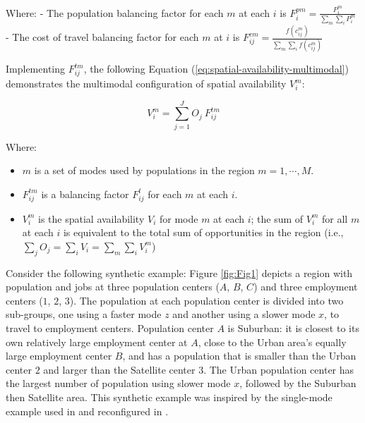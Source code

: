 \documentclass[]{trbunofficial}
\providecommand{\tightlist}{%
  \setlength{\itemsep}{0pt}\setlength{\parskip}{0pt}}
\begin{document}
\noindent Where: - The population balancing factor for each \(m\) at
each \(i\) is \(F^{pm}_{i} = \frac{P_{i}^m}{\sum_{m}\sum_{i} P_{i}^m}\)
- The cost of travel balancing factor for each \(m\) at \(i\) is
\(F_{ij}^{cm} = \frac{f(c_{ij}^m)}{\sum_{m} \sum_{i} f(c_{ij}^m)}\)

Implementing \(F^{tm}_{ij}\), the following Equation
(\ref{eq:spatial-availability-multimodal}) demonstrates the multimodal
configuration of spatial availability \(V_i^m\):

\begin{equation}
\label{eq:spatial-availability-multimodal}
V^m_{i} = \sum_{j=1}^J O_j\ F^{tm}_{ij}
\end{equation}

\noindent Where:

\begin{itemize}
\tightlist
\item
  \(m\) is a set of modes used by populations in the region
  \(m = 1, \cdots, M\).
\item
  \(F^{tm}_{ij}\) is a balancing factor \(F^t_{ij}\) for each \(m\) at
  each \(i\).
\item
  \(V^m_{i}\) is the spatial availability \(V_{i}\) for mode \(m\) at
  each \(i\); the sum of \(V^m_{i}\) for all \(m\) at each \(i\) is
  equivalent to the total sum of opportunities in the region (i.e.,
  \(\sum_j O_j = \sum_i V_i = \sum_{m} \sum_{i} V^m_{i}\))
\end{itemize}

Consider the following synthetic example: Figure \ref{fig:Fig1} depicts
a region with population and jobs at three population centers (\(A\),
\(B\), \(C\)) and three employment centers (\(1\), \(2\), \(3\)). The
population at each population center is divided into two sub-groups, one
using a faster mode \(z\) and another using a slower mode \(x\), to
travel to employment centers. Population center \(A\) is Suburban: it is
closest to its own relatively large employment center at \(A\), close to
the Urban area's equally large employment center \(B\), and has a
population that is smaller than the Urban center \(2\) and larger than
the Satellite center \(3\). The Urban population center has the largest
number of population using slower mode \(x\), followed by the Suburban
then Satellite area. This synthetic example was inspired by the
single-mode example used in
\citet{shenLocationCharacteristicsInnercity1998} and reconfigured in
\citet{soukhovIntroducingSpatialAvailability2023}.
\end{document}

